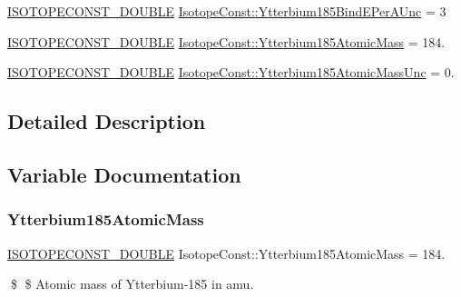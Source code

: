 \begin{DoxyCompactItemize}
\mbox{\hyperlink{group___isotope_const-_macros_ga8f45a7272ce02c0b4c65c44636ed719a}{I\+S\+O\+T\+O\+P\+E\+C\+O\+N\+S\+T\+\_\+\+D\+O\+U\+B\+LE}} \mbox{\hyperlink{group___isotope_const-_ytterbium-_yb185_gaa4576585affed54e1137ede6bd4985eb}{Isotope\+Const\+::\+Ytterbium185\+Bind\+E\+Per\+A\+Unc}} = 3
\item 
\mbox{\hyperlink{group___isotope_const-_macros_ga8f45a7272ce02c0b4c65c44636ed719a}{I\+S\+O\+T\+O\+P\+E\+C\+O\+N\+S\+T\+\_\+\+D\+O\+U\+B\+LE}} \mbox{\hyperlink{group___isotope_const-_ytterbium-_yb185_ga5f71f1bc5cccf9eb70f2f87a40fc4093}{Isotope\+Const\+::\+Ytterbium185\+Atomic\+Mass}} = 184.
\item 
\mbox{\hyperlink{group___isotope_const-_macros_ga8f45a7272ce02c0b4c65c44636ed719a}{I\+S\+O\+T\+O\+P\+E\+C\+O\+N\+S\+T\+\_\+\+D\+O\+U\+B\+LE}} \mbox{\hyperlink{group___isotope_const-_ytterbium-_yb185_ga7463252a37801c44028a729eeeac4fd4}{Isotope\+Const\+::\+Ytterbium185\+Atomic\+Mass\+Unc}} = 0.
\end{DoxyCompactItemize}


\subsection{Detailed Description}


\subsection{Variable Documentation}
\mbox{\label{group___isotope_const-_ytterbium-_yb185_ga5f71f1bc5cccf9eb70f2f87a40fc4093}} 
\subsubsection{\texorpdfstring{Ytterbium185\+Atomic\+Mass}{Ytterbium185AtomicMass}}
{\footnotesize\ttfamily \mbox{\hyperlink{group___isotope_const-_macros_ga8f45a7272ce02c0b4c65c44636ed719a}{I\+S\+O\+T\+O\+P\+E\+C\+O\+N\+S\+T\+\_\+\+D\+O\+U\+B\+LE}} Isotope\+Const\+::\+Ytterbium185\+Atomic\+Mass = 184.}

\$ \$ Atomic mass of Ytterbium-\/185 in amu. \mbox{\label{group___isotope_const-_ytterbium-_yb185_ga7463252a37801c44028a729eeeac4fd4}} 
